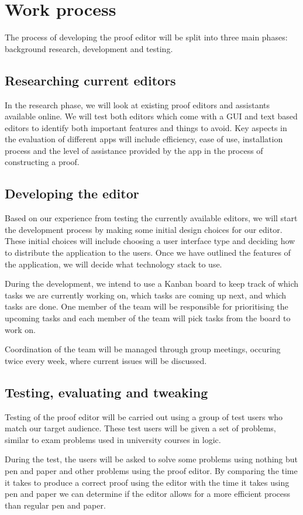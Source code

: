 \section{Work process}
The process of developing the proof editor will be split into three main phases: background research, development and testing.

\subsection{Researching current editors}
In the research phase, we will look at existing proof editors and assistants available online. We will test both editors which come with a GUI and text based editors to identify both important features and things to avoid. Key aspects in the evaluation of different apps will include efficiency, ease of use, installation process and the level of assistance provided by the app in the process of constructing a proof.

\subsection{Developing the editor}
Based on our experience from testing the currently available editors, we will start the development process by making some initial design choices for our editor. These initial choices will include choosing a user interface type and deciding how to distribute the application to the users. Once we have outlined the features of the application, we will decide what technology stack to use.

During the development, we intend to use a Kanban board to keep track of which tasks we are currently working on, which tasks are coming up next, and which tasks are done. One member of the team will be responsible for prioritising the upcoming tasks and each member of the team will pick tasks from the board to work on.

Coordination of the team will be managed through group meetings, occuring twice every week, where current issues will be discussed.

\subsection{Testing, evaluating and tweaking}
Testing of the proof editor will be carried out using a group of test users who match our target audience. These test users will be given a set of problems, similar to exam problems used in university courses in logic.

During the test, the users will be asked to solve some problems using nothing but pen and paper and other problems using the proof editor. By comparing the time it takes to produce a correct proof using the editor with the time it takes using pen and paper we can determine if the editor allows for a more efficient process than regular pen and paper.